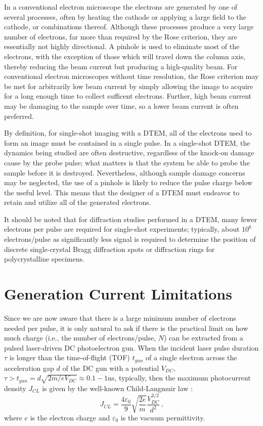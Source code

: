 In a conventional electron microscope the electrons are generated by one of several processes, often by heating the cathode or applying a large field to the cathode, or combinations thereof.
Although these processes produce a very large number of electrons, far more than required by the Rose criterion, they are essentially not highly directional.
A pinhole is used to eliminate most of the electrons, with the exception of those which will travel down the column axis, thereby reducing the beam current but producing a high-quality beam.
For conventional electron microscopes without time resolution, the Rose criterion may be met for arbitrarily low beam current by simply allowing the image to acquire for a long enough time to collect sufficent electrons.
Further, high beam current may be damaging to the sample over time, so a lower beam current is often preferred.

By definition, for single-shot imaging with a DTEM, all of the electrons used to form an image must be contained in a single pulse.
In a single-shot DTEM, the dynamics being studied are often destructive, regardless of the knock-on damage cause by the probe pulse; what matters is that the system be able to probe the sample before it is destroyed.
Nevertheless, although sample damage concerns may be neglected, the use of a pinhole is likely to reduce the pulse charge below the useful level.
This means that the designer of a DTEM must endeavor to retain and utilize all of the generated electrons.

It should be noted that for diffraction studies performed in a DTEM, many fewer electrons per pulse are required for single-shot experiments; typically, about $10^6$ electrons/pulse \cite{armstrong_practical_2007} as significantly less signal is required to determine the position of discrete single-crystal Bragg diffraction spots or diffraction rings for polycrystalline specimens.

\section{Generation Current Limitations} \label{sec:childs_law}

Since we are now aware that there is a large minimum number of electrons needed per pulse, it is only natural to ask if there is the practical limit on how much charge (i.e., the number of electrons/pulse, $N$) can be extracted from a pulsed laser-driven DC photoelectron gun.
When the incident laser pulse duration $\tau$ is longer than the time-of-flight (TOF) $t_{gun}$ of a single electron across the acceleration gap $d$ of the DC gun with a potential $V_{DC}$, $\tau > t_{gun} = d \sqrt{2m/eV_{DC}} \approx 0.1-1$ns, typically, then the maximum photocurrent density $J_{CL}$ is given by the well-known Child-Langmuir law \cite{child_discharge_1911,langmuir_effect_1923}:
\begin{equation}
  J_{CL} = \frac{4 \varepsilon_0}{9} \sqrt{\frac{2e}{m}} \frac{V_{DC}^{3/2}}{d^2} \,\text{,}
\end{equation}
where $e$ is the electron charge and $\varepsilon_0$ is the vacuum permittivity.

